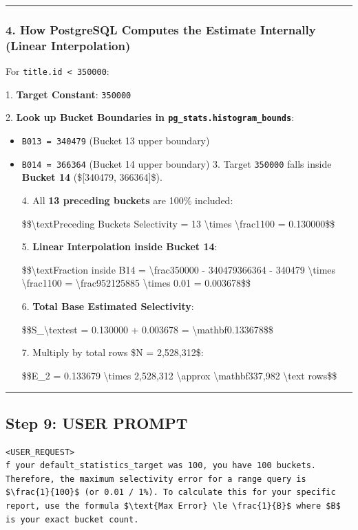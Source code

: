 \documentclass[11pt,a4paper]{article}
\begin{document}
{\hrule


\subsubsection{4. How PostgreSQL Computes the Estimate Internally (Linear Interpolation)}

For \texttt{title.id < 350000}:


1. \textbf{Target Constant}: \texttt{350000}

2. \textbf{Look up Bucket Boundaries in \texttt{pg\_stats.histogram\_bounds}}:

\begin{itemize}
\item \texttt{B013 = 340479} (Bucket 13 upper boundary)
\item \texttt{B014 = 366364} (Bucket 14 upper boundary)
3. Target \texttt{350000} falls inside \textbf{Bucket 14} (\$[340479, 366364]\$).

4. All \textbf{13 preceding buckets} are 100\% included:

\$\$\textbackslash{}text{Preceding Buckets Selectivity} = 13 \textbackslash{}times \textbackslash{}frac{1}{100} = 0.130000\$\$

5. \textbf{Linear Interpolation inside Bucket 14}:

\$\$\textbackslash{}text{Fraction inside B14} = \textbackslash{}frac{350000 - 340479}{366364 - 340479} \textbackslash{}times \textbackslash{}frac{1}{100} = \textbackslash{}frac{9521}{25885} \textbackslash{}times 0.01 = 0.003678\$\$

6. \textbf{Total Base Estimated Selectivity}:

\$\$S\_{\textbackslash{}text{est}} = 0.130000 + 0.003678 = \textbackslash{}mathbf{0.133678}\$\$

7. Multiply by total rows \$N = 2,528,312\$:

\$\$E\_2 = 0.133679 \textbackslash{}times 2,528,312 \textbackslash{}approx \textbackslash{}mathbf{337,982 \textbackslash{}text{ rows}}\$\$

\end{itemize}

\hrule

\subsection{Step 9: USER PROMPT}

\begin{lstlisting}[language=text]
<USER_REQUEST>
f your default_statistics_target was 100, you have 100 buckets. Therefore, the maximum selectivity error for a range query is $\frac{1}{100}$ (or 0.01 / 1%). To calculate this for your specific report, use the formula $\text{Max Error} \le \frac{1}{B}$ where $B$ is your exact bucket count.


\end{lstlisting}}
\end{document}

